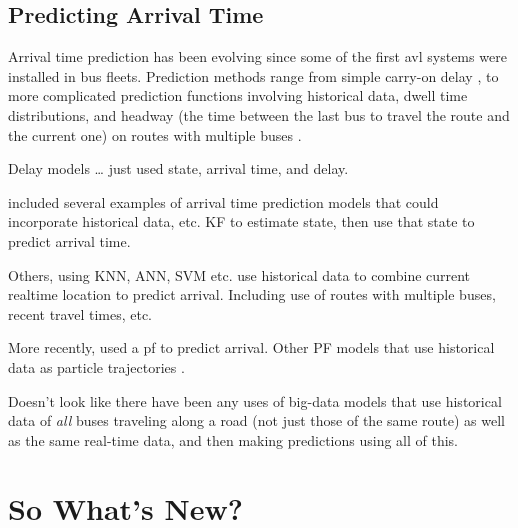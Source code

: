 \documentclass[12pt,a4paper]{article}
\begin{document}
\subsection{Predicting Arrival Time}
\label{sec:arrivaltimeprediction}

Arrival time prediction has been evolving since some of the first \gls{avl}
systems were installed in bus fleets.
Prediction methods range from simple carry-on delay \citep{cn},
to more complicated prediction functions involving historical data,
dwell time distributions, 
and headway (the time between the last bus to travel the route and the current one)
on routes with multiple buses 
\citep{cn}.


Delay models \ldots
\cite{dailey:2001} just used state, arrival time, and delay.


\cite{cathey-dailey:2003} included several examples of arrival time prediction models
that could incorporate historical data, etc.
KF to estimate state, then use that state to predict arrival time.


Others, using KNN, ANN, SVM etc. use historical data to combine current
realtime location to predict arrival.
Including use of routes with multiple buses, recent travel times, etc.


More recently, \cite{hans-etal:2015} used a \gls{pf} to predict arrival.
Other PF models that use historical data as particle trajectories
\citep{chen-rakha:2014}.


Doesn't look like there have been any uses of big-data models that use
historical data of \emph{all} buses traveling along a road
(not just those of the same route) as well as the same real-time data,
and then making predictions using all of this.












\section{So What's New?}
\label{sec:whatsnew}



\end{document}
